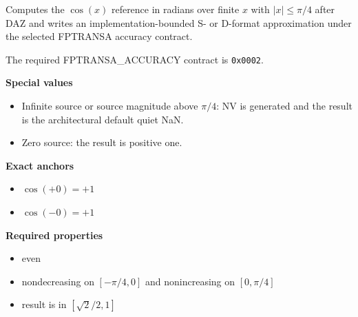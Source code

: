 Computes the $\cos(x)$ reference in radians over finite $x$ with $|x| \le \pi/4$ after DAZ and writes an implementation-bounded S- or D-format approximation under the selected FPTRANSA accuracy contract.

The required FPTRANSA\_ACCURACY contract is \texttt{0x0002}.

\textbf{Special values}\par
\begin{itemize}
\item Infinite source or source magnitude above $\pi/4$: NV is generated and the result is the architectural default quiet NaN.
\item Zero source: the result is positive one.
\end{itemize}

\textbf{Exact anchors}\par
\begin{itemize}
\item $\cos(+0) = +1$
\item $\cos(-0) = +1$
\end{itemize}

\textbf{Required properties}\par
\begin{itemize}
\item even
\item nondecreasing on $[-\pi/4, 0]$ and nonincreasing on $[0, \pi/4]$
\item result is in $[\sqrt{2}/2, 1]$
\end{itemize}
